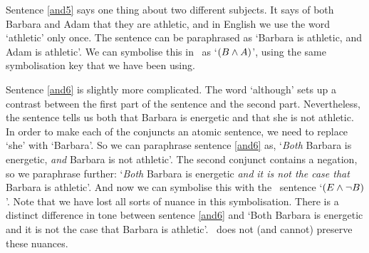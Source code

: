 Sentence \ref{and5} says one thing about two different subjects. It says of both Barbara and Adam that they are athletic, and in English we use the word `athletic' only once. The sentence can be paraphrased as `Barbara is athletic, and Adam is athletic'. We can symbolise this in \TFL\ as `$(B\wedge A)$', using the same symbolisation key that we have been using.

Sentence \ref{and6} is slightly more complicated. The word `although' sets up a contrast between the first part of the sentence and the second part. Nevertheless, the sentence tells us both that Barbara is energetic and that she is not athletic. In order to make each of the conjuncts an atomic sentence, we need to replace `she' with `Barbara'. So we can paraphrase sentence \ref{and6} as, `\emph{Both} Barbara is energetic, \emph{and} Barbara is not athletic'. The second conjunct contains a negation, so we paraphrase further: `\emph{Both} Barbara is energetic \emph{and} \emph{it is not the case that} Barbara is athletic'. And now we can symbolise this with the \TFL\ sentence `$(E\wedge\neg B)$'. Note that we have lost all sorts of nuance in this symbolisation. There is a distinct difference in tone between sentence \ref{and6} and `Both Barbara is energetic and it is not the case that Barbara is athletic'. \TFL\ does not (and cannot) preserve these nuances. 

